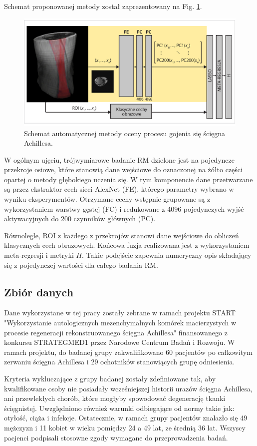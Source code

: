 Schemat proponowanej metody został zaprezentowany na Fig. \ref{fig:net}. 
\begin{figure}[h!]
	\includegraphics[width=\textwidth]{figures/net.jpg}
	\caption{Schemat automatycznej metody oceny procesu gojenia się ścięgna Achillesa.} \label{fig:net}
\end{figure}
W ogólnym ujęciu, trójwymiarowe badanie RM dzielone jest na pojedyncze przekroje osiowe, które stanowią dane wejściowe do oznaczonej na żółto części opartej o metody głębokiego uczenia się. W tym komponencie dane przetwarzane są przez ekstraktor cech sieci AlexNet (FE), którego parametry wybrano w wyniku eksperymentów. Otrzymane cechy wstępnie grupowane są z wykorzystaniem warstwy gęstej (FC) i redukowane z 4096 pojedynczych wyjść aktywacyjnych do 200 czynników głównych (PC).

Równolegle, ROI z każdego z przekrojów stanowi dane wejściowe do obliczeń klasycznych cech obrazowych. Końcowa fuzja realizowana jest z wykorzystaniem meta-regresji i metryki $H$. Takie podejście zapewnia numeryczny opis składający się z pojedynczej wartości dla całego badania RM.

\subsection{Zbiór danych}

Dane wykorzystane w tej pracy zostały zebrane w ramach projektu START "Wykorzystanie autologicznych mezenchymalnych komórek macierzystych w procesie regeneracji rekonstruowanego ścięgna Achillesa" finansowanego z konkursu STRATEGMED1 przez Narodowe Centrum Badań i Rozwoju. W ramach projektu, do badanej grupy zakwalifikowano 60 pacjentów po całkowitym zerwaniu ścięgna Achillesa i 29 ochotników stanowiących grupę odniesienia. 

Kryteria wykluczające z grupy badanej zostały zdefiniowane tak, aby kwalifikowane osoby nie posiadały wcześniejszej historii urazów ścięgna Achillesa, ani przewlekłych chorób, które mogłyby spowodować degenerację tkanki ścięgnistej. Uwzględniono również warunki odbiegające od normy takie jak: otyłość, ciąża i infekcje. Ostatecznie, w ramach grupy pacjentów znalazło się 49 mężczyzn i 11 kobiet w wieku pomiędzy 24 a 49 lat, ze średnią 36 lat. Wszyscy pacjenci podpisali stosowne zgody wymagane do przeprowadzenia badań.   

